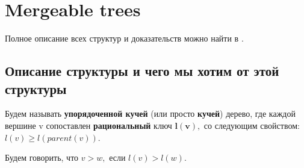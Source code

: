 
\section{Mergeable trees}
Полное описание всех структур и доказательств можно найти в \cite{georgiadis2011data}.
\subsection{Описание структуры и чего мы хотим от этой структуры}
Будем называть \textbf{упорядоченной кучей} (или просто \textbf{кучей}) дерево, где каждой вершине v сопоставлен \textbf{рациональный} ключ $\mathbf{l(v)},$ со следующим свойством: $l(v)\geqslant l(parent(v)).$

Будем говорить, что $v > w,$ если $l(v) > l(w).$

